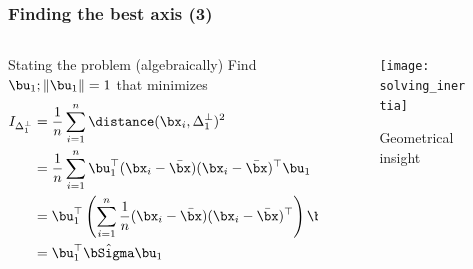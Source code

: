 \documentclass{beamer}\usepackage[]{graphicx}\usepackage[]{color}
\begin{document}
\begin{frame}
  \frametitle{Finding the best axis (3)}

\begin{columns}
  \begin{column}{.5\textwidth}
  \begin{block}{Stating the problem (algebraically)}
    Find $\bu_1; \|\bu_1 \|=1$ that minimizes
    \begin{equation*}
      \begin{aligned}
        I_{\Delta_1^\bot} & = \frac{1}{n}\sum_{i=1}^n \distance(\bx_i,\Delta_1^\bot)^2 \\ 
        & = \frac{1}{n}\sum_{i=1}^n \bu_1^\top (\bx_i - \bar{\bx})(\bx_i - \bar{\bx})^\top \bu_1 \\
        & = \bu_1^\top \left( \sum_{i=1}^n \frac{1}{n}(\bx_i - \bar{\bx})(\bx_i - \bar{\bx})^\top \right)  \bu_1 \\
        & = \bu_1^\top \hat{\bSigma}  \bu_1
      \end{aligned}
    \end{equation*} 
  \end{block}  
  \end{column}
  \begin{column}{.45\textwidth}
  \begin{figure}
    \texttt{[image: solving\_inertia]}
    \caption{Geometrical insight}
  \end{figure}
  \end{column}
\end{columns}
  
\end{frame}
\end{document}
